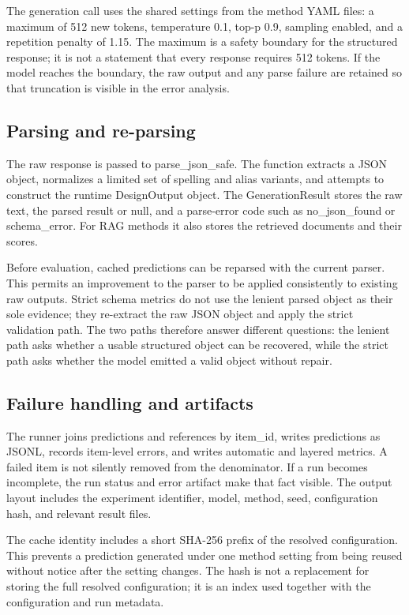 The generation call uses the shared settings from the method YAML files: a maximum of 512 new tokens, temperature 0.1, top-p 0.9, sampling enabled, and a repetition penalty of 1.15. The maximum is a safety boundary for the structured response; it is not a statement that every response requires 512 tokens. If the model reaches the boundary, the raw output and any parse failure are retained so that truncation is visible in the error analysis.

\subsection{Parsing and re-parsing}

The raw response is passed to parse\_json\_safe. The function extracts a JSON object, normalizes a limited set of spelling and alias variants, and attempts to construct the runtime DesignOutput object. The GenerationResult stores the raw text, the parsed result or null, and a parse-error code such as no\_json\_found or schema\_error. For RAG methods it also stores the retrieved documents and their scores.

Before evaluation, cached predictions can be reparsed with the current parser. This permits an improvement to the parser to be applied consistently to existing raw outputs. Strict schema metrics do not use the lenient parsed object as their sole evidence; they re-extract the raw JSON object and apply the strict validation path. The two paths therefore answer different questions: the lenient path asks whether a usable structured object can be recovered, while the strict path asks whether the model emitted a valid object without repair.

\subsection{Failure handling and artifacts}

The runner joins predictions and references by item\_id, writes predictions as JSONL, records item-level errors, and writes automatic and layered metrics. A failed item is not silently removed from the denominator. If a run becomes incomplete, the run status and error artifact make that fact visible. The output layout includes the experiment identifier, model, method, seed, configuration hash, and relevant result files.

The cache identity includes a short SHA-256 prefix of the resolved configuration. This prevents a prediction generated under one method setting from being reused without notice after the setting changes. The hash is not a replacement for storing the full resolved configuration; it is an index used together with the configuration and run metadata.


